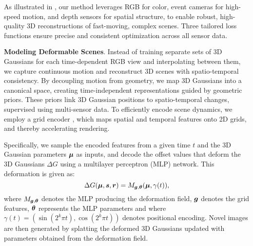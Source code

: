 As illustrated in \figureautorefname{~\ref{fig:overall}}, our method leverages RGB for color, event cameras for high-speed motion, and depth sensors for spatial structure, to
enable robust, high-quality 3D reconstructions of fast-moving, complex scenes. 
Three tailored loss functions ensure precise and consistent optimization across all sensor data.

\vspace{1mm}
\noindent
\textbf{Modeling Deformable Scenes}.
Instead of training separate sets of 3D Gaussians for each time-dependent RGB view and interpolating between them, we capture continuous motion and reconstruct 3D scenes with spatio-temporal consistency.
By decoupling motion from geometry, we map 3D Gaussians into a canonical space, creating time-independent representations guided by geometric priors.
These priors link 3D Gaussian positions to spatio-temporal changes, supervised using multi-sensor data.
To efficiently encode scene dynamics, we employ a grid encoder \cite{cao2023hexplane, wu20244d}, which maps spatial and temporal features onto 2D grids, and thereby accelerating rendering.

Specifically, we sample the encoded features from a given time $t$ and the 3D Gaussian parameters $\bm{\mu}$ as inputs, and decode the offset values that deform the 3D Gaussians $\Delta G$ using a multilayer perceptron (MLP) network. 
This deformation is given as:
\begin{equation}
   \Delta G(\bm{\mu},\bm{s},\bm{r}) = M_{\bm{g}, \bm{\theta}}(\bm{\mu}, \gamma(t)),
   \label{eq:deformation-field}
\end{equation}
where $M_{\bm{g}, \bm{\theta}}$ denotes the MLP producing the deformation field, $\bm{g}$ denotes the grid features, ${\bm{\theta}}$ represents the MLP parameters and 
where 
$\gamma(t) = (\sin(2^k \pi t), \cos(2^k \pi t))$ denotes positional encoding.
Novel images are then generated by splatting the deformed 3D Gaussians updated with parameters obtained from the deformation field.




